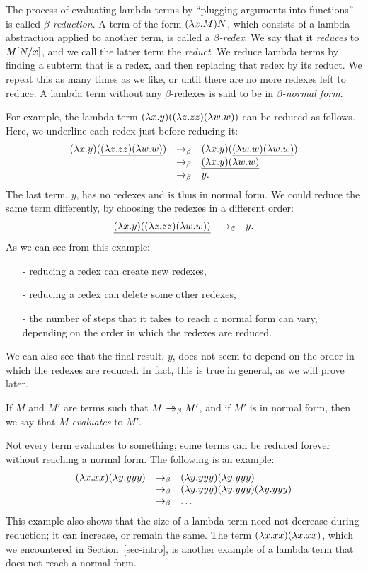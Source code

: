 \documentclass{article}
\begin{document}
The process of evaluating lambda terms by ``plugging arguments into
functions'' is called {\em $\beta$-reduction}. A term of the form
$(\lambda x.M)N$, which consists of a lambda abstraction applied to
another term, is called a {\em $\beta$-redex}. We say that it {\em
  reduces} to $M[N/x]$, and we call the latter term the {\em
  reduct}. We reduce lambda terms by finding a subterm that is a
redex, and then replacing that redex by its reduct. We repeat this as
many times as we like, or until there are no more redexes left to
reduce. A lambda term without any $\beta$-redexes is said to be in {\em
  $\beta$-normal form}.

For example, the lambda term $(\lambda x.y)((\lambda z.zz)(\lambda w.w))$ can
be reduced as follows. Here, we underline each redex just before
reducing it:
\[ \begin{array}{lll}
  (\lambda x.y)(\underline{(\lambda z.zz)(\lambda w.w)}) 
  &\rightarrow_{\beta}& (\lambda x.y)(\underline{(\lambda w.w)(\lambda w.w)}) \\
  &\rightarrow_{\beta}& \underline{(\lambda x.y)(\lambda w.w)} \\
  &\rightarrow_{\beta}& y.
\end{array}
\]
The last term, $y$, has no redexes and is thus in normal form.
We could reduce the same term differently, by choosing the redexes in
a different order:
\[ \begin{array}{lll}
  \underline{(\lambda x.y)((\lambda z.zz)(\lambda w.w))}
  &\rightarrow_{\beta}& y.
\end{array}
\]
As we can see from this example:
\begin{itemize}
\item[-] reducing a redex can create new redexes,
\item[-] reducing a redex can delete some other redexes,
\item[-] the number of steps that it takes to reach a normal form
  can vary, depending on the order in which the redexes are reduced.
\end{itemize}
We can also see that the final result, $y$, does not seem to depend on
the order in which the redexes are reduced. In fact, this is true in
general, as we will prove later.

If $M$ and $M'$ are terms such that $M\mathrel{\rightarrow\!\!\!\!\!\rightarrow}_{\beta} M'$, and if $M'$ is in
normal form, then we say that $M$ {\em evaluates} to $M'$. 

Not every term evaluates to something; some terms can be reduced
forever without reaching a normal form. The following is an example:
\[ \begin{array}{lll}
  (\lambda x.xx)(\lambda y.yyy) 
  &\rightarrow_{\beta}& (\lambda y.yyy)(\lambda y.yyy) \\
  &\rightarrow_{\beta}& (\lambda y.yyy)(\lambda y.yyy)(\lambda y.yyy) \\
  &\rightarrow_{\beta}& \ldots
\end{array}
\]
This example also shows that the size of a lambda term need not
decrease during reduction; it can increase, or remain the same. The
term $(\lambda x.xx)(\lambda x.xx)$, which we encountered in
Section~\ref{sec-intro}, is another example of a lambda term that
does not reach a normal form. 
\end{document}
